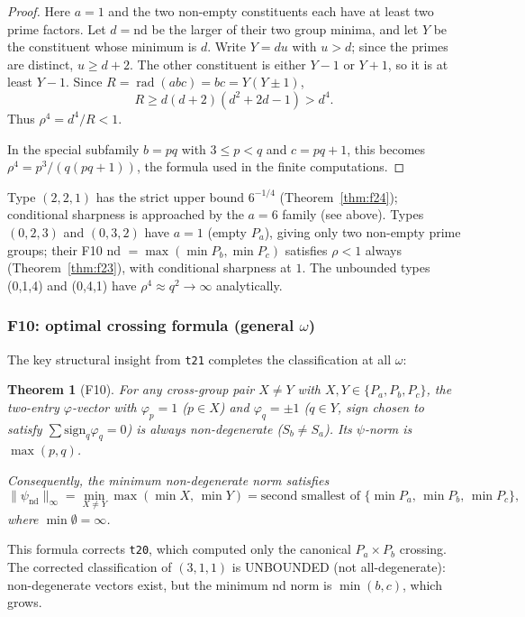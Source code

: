 \documentclass[12pt]{article}
\newtheorem{theorem}{Theorem}
\theoremstyle{definition}
\DeclareMathOperator{\rad}{rad}
\begin{document}
\begin{proof}
Here $a=1$ and the two non-empty constituents each have at least two prime
factors.  Let $d=\mathrm{nd}$ be the larger of their two group minima, and let
$Y$ be the constituent whose minimum is $d$.  Write $Y=du$ with $u>d$; since
the primes are distinct, $u\ge d+2$.  The other constituent is either $Y-1$
or $Y+1$, so it is at least $Y-1$.  Since $R=\rad(abc)=bc=Y(Y\pm1)$,
\[
  R\ge d(d+2)(d^2+2d-1)>d^4.
\]
Thus $\rho^4=d^4/R<1$.

In the special subfamily $b=pq$ with $3\le p<q$ and $c=pq+1$, this becomes
$\rho^4=p^3/(q(pq+1))$, the formula used in the finite computations.
\end{proof}

Type $(2,2,1)$ has the strict upper bound $6^{-1/4}$ (Theorem~\ref{thm:f24});
conditional sharpness is approached by the $a=6$ family (see above).
Types $(0,2,3)$ and $(0,3,2)$ have $a=1$ (empty $P_a$), giving only two non-empty prime
groups; their F10 nd $= \max(\min P_b, \min P_c)$ satisfies $\rho < 1$ always
(Theorem~\ref{thm:f23}), with conditional sharpness at $1$.
The unbounded types (0,1,4) and (0,4,1) have $\rho^4 \approx q^2 \to \infty$ analytically.

\subsubsection*{F10: optimal crossing formula (general $\omega$)}

The key structural insight from \texttt{t21} completes the classification at all $\omega$:

\begin{theorem}[F10]\label{thm:f10}
For any cross-group pair $X \ne Y$ with $X, Y \in \{P_a, P_b, P_c\}$, the two-entry
$\varphi$-vector with $\varphi_p = 1$ ($p \in X$) and $\varphi_q = \pm 1$ ($q \in Y$,
sign chosen to satisfy $\sum \mathrm{sign}_q \varphi_q = 0$) is \emph{always}
non-degenerate ($S_b \ne S_a$).  Its $\psi$-norm is $\max(p, q)$.

Consequently, the minimum non-degenerate norm satisfies
\[
  \|\psi_{\mathrm{nd}}\|_\infty
    = \min_{X \ne Y} \max(\min X,\, \min Y)
    = \text{second smallest of } \{\min P_a,\, \min P_b,\, \min P_c\},
\]
where $\min \emptyset = \infty$.
\end{theorem}

This formula corrects \texttt{t20}, which computed only the canonical $P_a \times P_b$
crossing. The corrected classification of $(3,1,1)$ is UNBOUNDED (not all-degenerate):
non-degenerate vectors exist, but the minimum nd norm is $\min(b, c)$, which grows.
\end{document}
